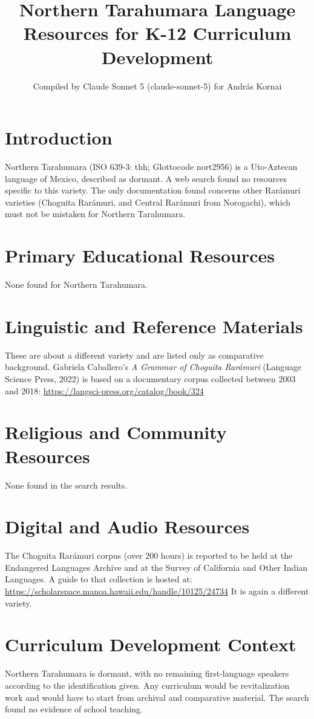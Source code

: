\documentclass[12pt]{article}
\title{Northern Tarahumara Language Resources for K-12 Curriculum Development}
\author{Compiled by Claude Sonnet 5 (claude-sonnet-5) for Andr\'as Kornai}
\date{}
\begin{document}
\maketitle

\section{Introduction}
Northern Tarahumara (ISO 639-3: thh; Glottocode nort2956) is a Uto-Aztecan language of Mexico, described as dormant. A web search found no resources specific to this variety. The only documentation found concerns other Rar\'amuri varieties (Choguita Rar\'amuri, and Central Rar\'amuri from Norogachi), which must not be mistaken for Northern Tarahumara.

\section{Primary Educational Resources}
None found for Northern Tarahumara.

\section{Linguistic and Reference Materials}
These are about a different variety and are listed only as comparative background. Gabriela Caballero's \emph{A Grammar of Choguita Rar\'amuri} (Language Science Press, 2022) is based on a documentary corpus collected between 2003 and 2018:
\url{https://langsci-press.org/catalog/book/324}

\section{Religious and Community Resources}
None found in the search results.

\section{Digital and Audio Resources}
The Choguita Rar\'amuri corpus (over 200 hours) is reported to be held at the Endangered Languages Archive and at the Survey of California and Other Indian Languages. A guide to that collection is hosted at:
\url{https://scholarspace.manoa.hawaii.edu/handle/10125/24734}
It is again a different variety.

\section{Curriculum Development Context}
Northern Tarahumara is dormant, with no remaining first-language speakers according to the identification given. Any curriculum would be revitalization work and would have to start from archival and comparative material. The search found no evidence of school teaching.
\end{document}
